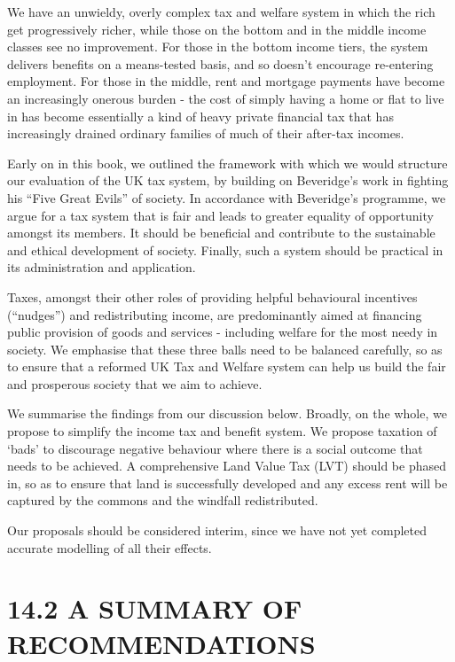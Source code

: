 \documentclass[]{tufte-handout}
\begin{document}
We have an unwieldy, overly complex tax and welfare system in which the
rich get progressively richer, while those on the bottom and in the
middle income classes see no improvement. For those in the bottom income
tiers, the system delivers benefits on a means-tested basis, and so
doesn't encourage re-entering employment. For those in the middle, rent
and mortgage payments have become an increasingly onerous burden - the
cost of simply having a home or flat to live in has become essentially a
kind of heavy private financial tax that has increasingly drained
ordinary families of much of their after-tax incomes.

Early on in this book, we outlined the framework with which we would
structure our evaluation of the UK tax system, by building on
Beveridge's work in fighting his ``Five Great Evils'' of society. In
accordance with Beveridge's programme, we argue for a tax system that is
fair and leads to greater equality of opportunity amongst its members.
It should be beneficial and contribute to the sustainable and ethical
development of society. Finally, such a system should be practical in
its administration and application.

Taxes, amongst their other roles of providing helpful behavioural
incentives (``nudges'') and redistributing income, are predominantly
aimed at financing public provision of goods and services - including
welfare for the most needy in society. We emphasise that these three
balls need to be balanced carefully, so as to ensure that a reformed UK
Tax and Welfare system can help us build the fair and prosperous society
that we aim to achieve.

We summarise the findings from our discussion below. Broadly, on the
whole, we propose to simplify the income tax and benefit system. We
propose taxation of `bads' to discourage negative behaviour where there
is a social outcome that needs to be achieved. A comprehensive Land
Value Tax (LVT) should be phased in, so as to ensure that land is
successfully developed and any excess rent will be captured by the
commons and the windfall redistributed.

Our proposals should be considered interim, since we have not yet
completed accurate modelling of all their effects.

\hypertarget{a-summary-of-recommendations}{%
\section{14.2 A SUMMARY OF
RECOMMENDATIONS}\label{a-summary-of-recommendations}}
\end{document}
